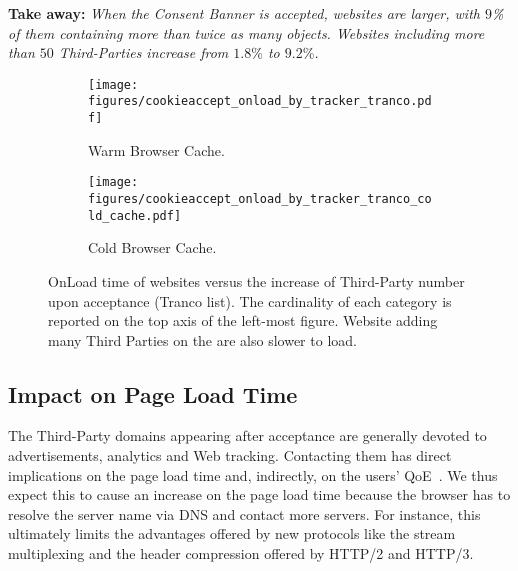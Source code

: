 \textbf{Take away:} 
\textit{When the Consent Banner is accepted, websites are larger, with $9$\% of them containing more than twice as many objects. Websites including more than $50$ Third-Parties increase from $1.8\%$ to $9.2\%$.}


\begin{figure}[!t]
    \centering
    \begin{subfigure}[t]{0.495\columnwidth}
        \texttt{[image: figures/cookieaccept\_onload\_by\_tracker\_tranco.pdf]}
        \caption{Warm Browser Cache.}
        \label{fig:ca_onload_warm}
    \end{subfigure}
    \begin{subfigure}[t]{0.495\columnwidth}
        \texttt{[image: figures/cookieaccept\_onload\_by\_tracker\_tranco\_cold\_cache.pdf]}
        \caption{Cold Browser Cache.}
        \label{fig:ca_onload_cold}
    \end{subfigure}
    \caption{OnLoad time of websites versus the increase of Third-Party number upon acceptance (Tranco list). The cardinality of each category is reported on the top axis of the left-most figure. Website adding many Third Parties on the \AFTER are also slower to load. }
     \label{fig:ca_onload}
\end{figure}

\subsection{Impact on Page Load Time}

The Third-Party domains appearing after acceptance are generally devoted to advertisements, analytics and Web tracking. %
Contacting them has direct implications on the page load time and, indirectly, on the users' QoE~\cite{da2018narrowing}. We thus expect this to cause an increase on the page load time because the browser has to resolve the server name via DNS and contact more servers. For instance, this ultimately limits the advantages offered by new protocols like the stream multiplexing and the header compression offered by HTTP/2 and HTTP/3.

